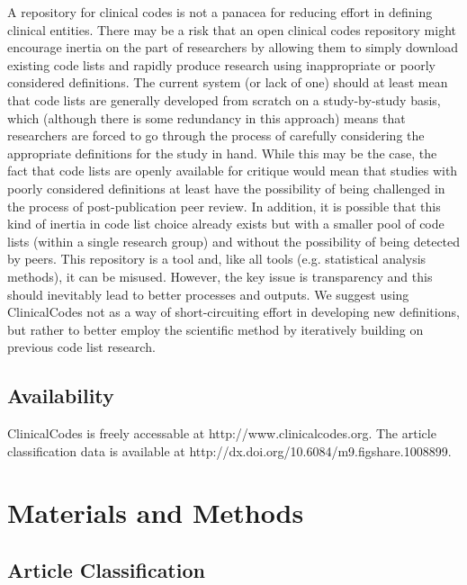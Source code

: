 \documentclass[10pt]{article}
\begin{document}
A repository for clinical codes is not a panacea for reducing effort in defining clinical entities. There may be a risk that an open clinical codes repository might encourage inertia on the part of researchers by allowing them to simply download existing code lists and rapidly produce research using inappropriate or poorly considered definitions. The current system (or lack of one) should at least mean that code lists are generally developed from scratch on a study-by-study basis, which (although there is some redundancy in this approach) means that researchers are forced to go through the process of carefully considering the appropriate definitions for the study in hand. While this may be the case, the fact that code lists are openly available for critique would mean that studies with poorly considered definitions at least have the possibility of being challenged in the process of post-publication peer review. In addition, it is possible that this kind of inertia in code list choice already exists but with a smaller pool of code lists (within a single research group) and without the possibility of being detected by peers. This repository is a tool and, like all tools (e.g. statistical analysis methods), it can be misused. However, the key issue is transparency and this should inevitably lead to better processes and outputs. We suggest using ClinicalCodes not as a way of short-circuiting effort in developing new definitions, but rather to better employ the scientific method by iteratively building on previous code list research. 

\subsection*{Availability}


ClinicalCodes is freely accessable at http://www.clinicalcodes.org. The article classification data is available at http://dx.doi.org/10.6084/m9.figshare.1008899.

\section*{Materials and Methods}

\subsection*{Article Classification}
\end{document}
